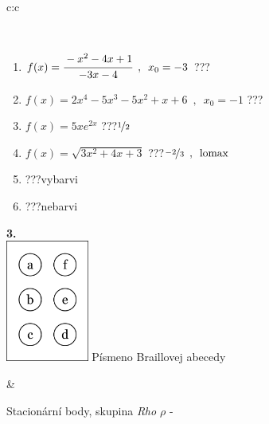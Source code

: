 \documentclass[10pt]{report}
\begin{document}
\begin{tabular}{c:c}
\begin{minipage}[c][104.5mm][t]{0.5\linewidth}
\begin{center}
\begin{minipage}{0.95\linewidth}
\begin{center}
\end{center}
\end{minipage}
\\[1mm]
\begin{minipage}{0.79\linewidth}
\begin{center}
\begin{varwidth}{\linewidth}
\begin{enumerate}
\normalsize
\item $f(x)=\cfrac{-x^2-4x+1}{-3x-4}\enspace , \enspace x_0=-3$\quad \dotfill\; ???\;\dotfill \quad {}
\item $f(x)=2x^4-5x^3-5x^2+x+6\enspace , \enspace x_0=-1$\quad \dotfill\; ???\;\dotfill \quad {}
\item $f(x)=5xe^{2x}$\quad \dotfill\; ???\;\dotfill \quad $\nicefrac{1}{2}$
\item $f(x)=\sqrt{3x^2+4x+3}$\quad \dotfill\; ???\;\dotfill \quad $\nicefrac{-2}{3}\enspace , \enspace\mathrm{lomax}$
\item \quad \dotfill\; ???\;\dotfill \quad vybarvi
\item \quad \dotfill\; ???\;\dotfill \quad nebarvi
\end{enumerate}
\end{varwidth}
\end{center}
\end{minipage}
\begin{minipage}{0.20\linewidth}
\begin{center}
{\Huge\bfseries 3.} \\[2mm]
\includegraphics[height=40mm]{../images/braille.png}
{\small Písmeno Braillovej abecedy}
\end{center}
\end{minipage}
\end{center}
\end{minipage}
&
\begin{minipage}[c][104.5mm][t]{0.5\linewidth}
\begin{center}
\vspace{7mm}
{\huge Stacionární body, skupina \textit{Rho $\rho$} -}\\[5mm]

\end{center}
\end{minipage}
\end{tabular}
\end{document}
